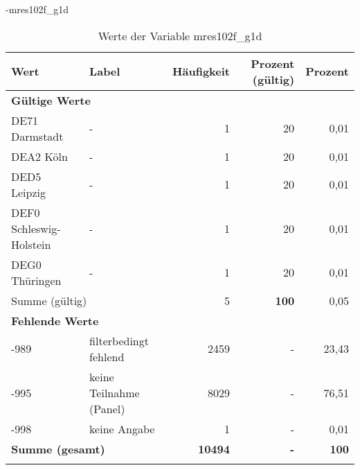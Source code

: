                 \vspace*{-\baselineskip}
					\begin{filecontents}{\jobname-mres102f_g1d}
					\begin{longtable}{Xlrrr}
					\toprule
					\textbf{Wert} & \textbf{Label} & \textbf{Häufigkeit} & \textbf{Prozent (gültig)} & \textbf{Prozent} \\
					\endhead
					\midrule
					\multicolumn{5}{l}{\textbf{Gültige Werte}}\\

					\multicolumn{1}{X}{DE71 Darmstadt} &
					- &
					1 &
					20 &
					0,01 \\
					
					\multicolumn{1}{X}{DEA2 Köln} &
					- &
					1 &
					20 &
					0,01 \\
					
					\multicolumn{1}{X}{DED5 Leipzig} &
					- &
					1 &
					20 &
					0,01 \\
					
					\multicolumn{1}{X}{DEF0 Schleswig-Holstein} &
					- &
					1 &
					20 &
					0,01 \\
					
					\multicolumn{1}{X}{DEG0 Thüringen} &
					- &
					1 &
					20 &
					0,01 \\
					\midrule
						\multicolumn{2}{l}{Summe (gültig)} & 5 &
						\textbf{100} &
					    0,05 \\
					\multicolumn{5}{l}{\textbf{Fehlende Werte}}\\
							-989 & filterbedingt fehlend & 2459 & - & 23,43 \\

							-995 & keine Teilnahme (Panel) & 8029 & - & 76,51 \\

							-998 & keine Angabe & 1 & - & 0,01 \\

					\midrule
					\multicolumn{2}{l}{\textbf{Summe (gesamt)}} & \textbf{10494} & \textbf{-} & \textbf{100} \\
					\bottomrule
					\caption{Werte der Variable mres102f\_g1d}
					\end{longtable}
					\end{filecontents}


